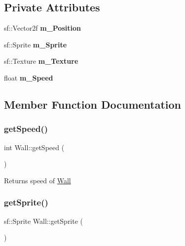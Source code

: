 \subsection*{Private Attributes}
\begin{DoxyCompactItemize}
\item 
\mbox{\label{class_wall_a69fa88f390c11b1323089f13c3341315}} 
sf\+::\+Vector2f {\bfseries m\+\_\+\+Position}
\item 
\mbox{\label{class_wall_afc9ef46b9c8de8f2a66529877b646531}} 
sf\+::\+Sprite {\bfseries m\+\_\+\+Sprite}
\item 
\mbox{\label{class_wall_ac2a2590630eaea3721dc5742376c1b3a}} 
sf\+::\+Texture {\bfseries m\+\_\+\+Texture}
\item 
\mbox{\label{class_wall_a57bad80fdd83bcb9f495a2cf161537e9}} 
float {\bfseries m\+\_\+\+Speed}
\end{DoxyCompactItemize}


\subsection{Member Function Documentation}
\mbox{\label{class_wall_a8641042afcc4d4279cf972d9fe1518bc}} 
\subsubsection{\texorpdfstring{getSpeed()}{getSpeed()}}
{\footnotesize\ttfamily int Wall\+::get\+Speed (\begin{DoxyParamCaption}{ }\end{DoxyParamCaption})}



Returns speed of \mbox{\hyperlink{class_wall}{Wall}} 

\mbox{\label{class_wall_aadfad87e486dda5bb3ebc9e76f3a5a25}} 
\subsubsection{\texorpdfstring{getSprite()}{getSprite()}}
{\footnotesize\ttfamily sf\+::\+Sprite Wall\+::get\+Sprite (\begin{DoxyParamCaption}{ }\end{DoxyParamCaption})}



